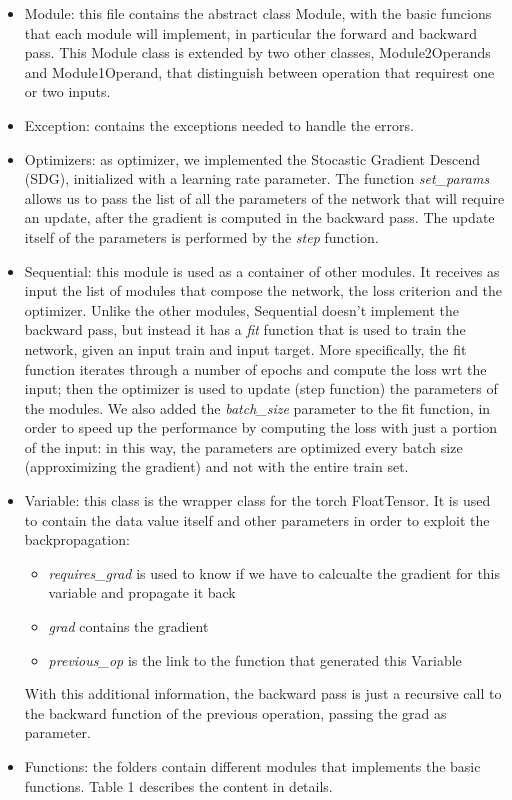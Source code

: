 \documentclass[10pt,conference,compsocconf]{IEEEtran}
\begin{document}
\begin{itemize}
	\item Module: this file contains the abstract class Module, with the basic funcions that each module will implement, in particular the forward and backward pass. This Module class is extended by two other classes, Module2Operands and Module1Operand, that distinguish between operation that requirest one or two inputs. 
	
	\item Exception: contains the exceptions needed to handle the errors.
	
	\item Optimizers: as optimizer, we implemented the Stocastic Gradient Descend (SDG), initialized with a learning rate parameter. The function \textit{set\_params} allows us to pass the list of all the parameters of the network that will require an update, after the gradient is computed in the backward pass. The update itself of the parameters is performed by the \textit{step} function.
	
	\item Sequential: this module is used as a container of other modules. It receives as input the list of modules that compose the network, the loss criterion and the optimizer. Unlike the other modules, Sequential doesn't implement the backward pass, but instead it has a \textit{fit} function that is used to train the network, given an input train and input target. More specifically, the fit function iterates through a number of epochs and compute the loss wrt the input; then the optimizer is used to update (step function) the parameters of the modules. We also added the \textit{batch\_size} parameter to the fit function, in order to speed up the performance by computing the loss with just a portion of the input: in this way, the parameters are optimized every batch size (approximizing the gradient) and not with the entire train set.
	
	\item Variable: this class is the wrapper class for the torch FloatTensor. It is used to contain the data value itself and other parameters in order to exploit the backpropagation:
	\begin{itemize}
		\item \textit{requires\_grad} is used to know if we have to calcualte the gradient for this variable and propagate it back
		\item \textit{grad} contains the gradient
		\item \textit{previous\_op} is the link to the function that generated this Variable
	\end{itemize}
	With this additional information, the backward pass is just a recursive call to the backward function of the previous operation, passing the grad as parameter. 
	
	\item Functions: the folders contain different modules that implements the basic functions. Table 1 describes the content in details.
\end{itemize}
\end{document}
